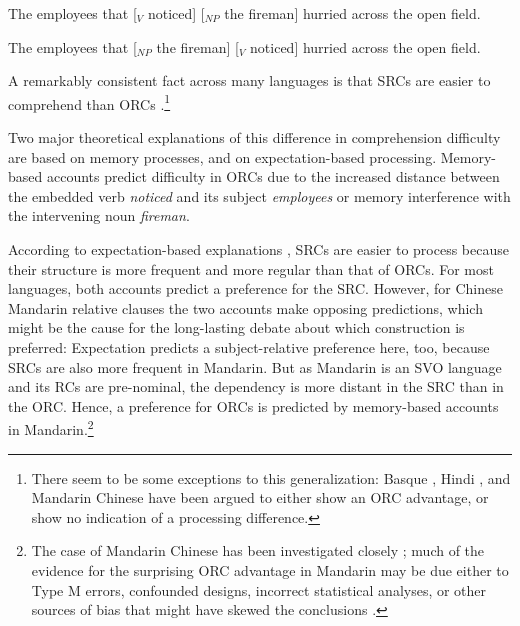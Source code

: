 \documentclass{cambridge7A}\usepackage[]{graphicx}\usepackage[]{color}
\begin{document}
\begin{exe}
\ex\label{ex:staub10}
\begin{xlist}
  \item The employees that [$_{V}$ noticed] [$_{NP}$ the fireman] hurried across the open field.
  \item The employees that [$_{NP}$ the fireman] [$_V$ noticed] hurried across the open field.
\end{xlist}
\end{exe}

A remarkably consistent fact across many languages is that SRCs are easier to comprehend than ORCs \cite[e.g.,][]{KingJust1991,GibsonDesmetGrodner2005,TraxlerMorrisSeely2002,SchriefersFriedericiKuhn1995,Frazier1987a,KwonGordonLee2010}.\footnote{There seem to be some exceptions to this generalization: Basque \citep{carreiras2010subject}, Hindi \citep{VasishthLewis2006}, and Mandarin Chinese \citep{HsiaoGibson2003} have been argued to either show an ORC advantage, or show no indication of a processing difference.}

Two major theoretical explanations of this difference in comprehension difficulty are based on memory processes, and on expectation-based processing. Memory-based accounts \citep{Gibson1998,Gibson2000,grodner,LewisVasishth2005,LewisVasishthVanDyke2006,McElreeForakerDyer2003} predict difficulty in ORCs due to the increased distance between the embedded verb \textit{noticed} and its subject \textit{employees} or memory interference with the intervening noun \textit{fireman}.
 
According to expectation-based explanations \citep{Hale2001,Levy2008,GennariMacDonald2009,MitchellCuetosCorley1995}, SRCs are easier to process because their structure is more frequent and more regular than that of ORCs. For most languages, both accounts predict a preference for the SRC. However, for Chinese Mandarin relative clauses the two accounts make opposing predictions, which might be the cause for the long-lasting debate about which construction is preferred: Expectation predicts a subject-relative preference here, too, because SRCs are also more frequent in Mandarin. But as Mandarin is an SVO language and its RCs are pre-nominal, the dependency is more distant in the SRC than in the ORC. Hence, a preference for ORCs is predicted by memory-based accounts in Mandarin.\footnote{The case of Mandarin Chinese has been investigated closely \citep{gibsonwu,LinBever2006,HsiaoMacDonald2013,VasishthChenLi2013,JagerChenLi2015,WuKaiserVasishth2017}; much of the evidence for the surprising ORC advantage in Mandarin may be due either to Type M errors, confounded designs, incorrect statistical analyses, or other sources of bias that might have skewed the conclusions \citep{Vasishth:MScStatistics}.}
\end{document}
